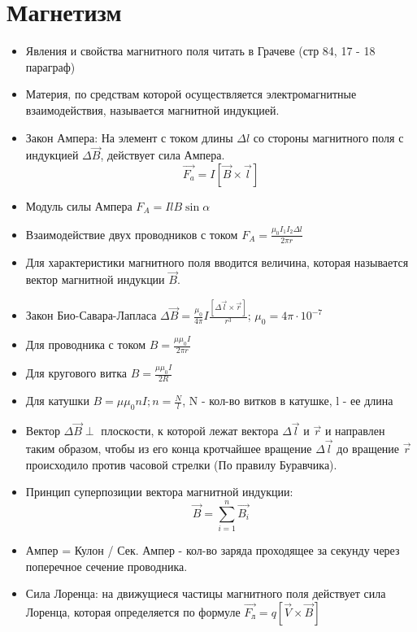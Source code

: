 \documentclass{article}
\begin{document}
\section{Магнетизм}
\begin{flushleft}
    \begin{itemize}
        \item Явления и свойства магнитного поля читать в Грачеве (стр 84, 17 - 18 параграф)
        \item Материя, по средствам которой осуществляется электромагнитные взаимодействия, называется магнитной индукцией.
        \item Закон Ампера: На элемент с током длины $\Delta l$ со стороны магнитного поля с индукцией $\Delta \overrightarrow{B}$, действует сила Ампера. \[\overrightarrow{F_a} = I [\overrightarrow{B} \times \overrightarrow{l}]\]
        \item Модуль силы Ампера $F_A = IlB \sin{\alpha}$
        \item Взаимодействие двух проводников с током $F_A = \frac{\mu_0 I_1 I_2 \Delta l} {2 \pi r}$
        \item Для характеристики магнитного поля вводится величина, которая называется вектор магнитной индукции $\overrightarrow{B}$. 
        \item Закон Био-Савара-Лапласа $\Delta \overrightarrow{B} = \frac{\mu_0}{4 \pi} I \frac{[\Delta \overrightarrow{l} \times \overrightarrow{r}]}{r^3}$; $\mu_0 = 4 \pi \cdot 10^{-7}$
        \item Для проводника с током $B = \frac{\mu \mu_0 I}{2 \pi r}$
        \item Для кругового витка $B = \frac{\mu \mu_0 I}{2R}$
        \item Для катушки $B = \mu \mu_0 nI; n = \frac{N}{l}$, N - кол-во витков в катушке, l - ее длина
        \item Вектор $\Delta \overrightarrow{B} \perp$ плоскости, к которой лежат вектора $\Delta \overrightarrow{l}$ и $\overrightarrow{r}$ и направлен таким образом, чтобы из его конца кротчайшее вращение $\Delta \overrightarrow{l}$ до вращение $\overrightarrow{r}$ происходило против часовой стрелки (По правилу Буравчика). 
        \item Принцип суперпозиции вектора магнитной индукции: \[ \overrightarrow{B} = \sum_{i = 1}^n \overrightarrow{B_i}\]
        \item Ампер = Кулон / Сек. Ампер - кол-во заряда проходящее за секунду через поперечное сечение проводника.
        \item Сила Лоренца: на движущиеся частицы магнитного поля действует сила Лоренца, которая определяется по формуле $\overrightarrow{F_\text{л}} = q[\overrightarrow{V} \times \overrightarrow{B}]$

\end{itemize}
\end{flushleft}
\end{document}

